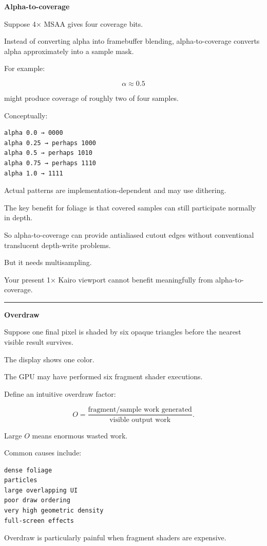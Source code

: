 \textbf{Alpha-to-coverage}

Suppose 4× MSAA gives four coverage bits.

Instead of converting alpha into framebuffer blending, alpha-to-coverage converts alpha approximately into a sample mask.

For example:

\[
\alpha\approx0.5
\]

might produce coverage of roughly two of four samples.

Conceptually:

\begin{verbatim}
alpha 0.0 → 0000
alpha 0.25 → perhaps 1000
alpha 0.5 → perhaps 1010
alpha 0.75 → perhaps 1110
alpha 1.0 → 1111
\end{verbatim}

Actual patterns are implementation-dependent and may use dithering.

The key benefit for foliage is that covered samples can still participate normally in depth.

So alpha-to-coverage can provide antialiased cutout edges without conventional translucent depth-write problems.

But it needs multisampling.

Your present 1× Kairo viewport cannot benefit meaningfully from alpha-to-coverage.

\begin{center}\rule{0.5\linewidth}{0.5pt}\end{center}

\textbf{Overdraw}

Suppose one final pixel is shaded by six opaque triangles before the nearest visible result survives.

The display shows one color.

The GPU may have performed six fragment shader executions.

Define an intuitive overdraw factor:

\[
O=
\frac{\text{fragment/sample work generated}}
{\text{visible output work}}.
\]

Large \(O\) means enormous wasted work.

Common causes include:

\begin{verbatim}
dense foliage
particles
large overlapping UI
poor draw ordering
very high geometric density
full-screen effects
\end{verbatim}

Overdraw is particularly painful when fragment shaders are expensive.

